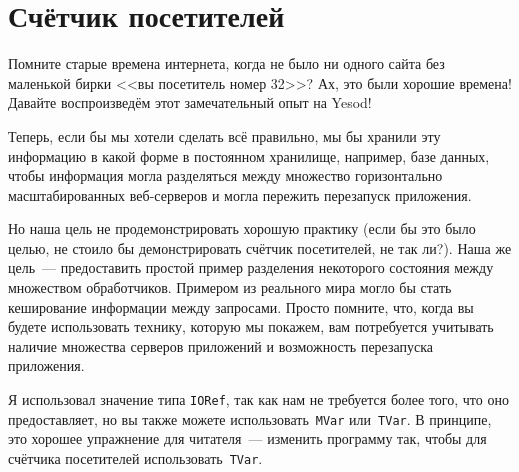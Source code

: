 \chapter{Счётчик посетителей}

Помните старые времена интернета, когда не было ни одного сайта без
маленькой бирки <<вы посетитель номер 32>>? Ах, это были хорошие времена!
Давайте воспроизведём этот замечательный опыт на Yesod!

Теперь, если бы мы хотели сделать всё правильно, мы бы хранили эту информацию в
какой форме в постоянном хранилище, например, базе данных, чтобы информация
могла разделяться между множество горизонтально масштабированных веб-серверов
и могла пережить перезапуск приложения.

Но наша цель не продемонстрировать хорошую практику (если бы это было целью, не
стоило бы демонстрировать счётчик посетителей, не так ли?). Наша же цель~---
предоставить простой пример разделения некоторого состояния между множеством
обработчиков. Примером из реального мира могло бы стать кеширование информации
между запросами. Просто помните, что, когда вы будете использовать технику,
которую мы покажем, вам потребуется учитывать наличие множества серверов
приложений и возможность перезапуска приложения.


Я использовал значение типа \lstinline'IORef', так как нам не требуется более
того, что оно предоставляет, но вы также можете использовать~\lstinline'MVar'
или~\lstinline'TVar'. В принципе, это хорошее упражнение для читателя~---
изменить программу так, чтобы для счётчика посетителей
использовать~\lstinline'TVar'.
